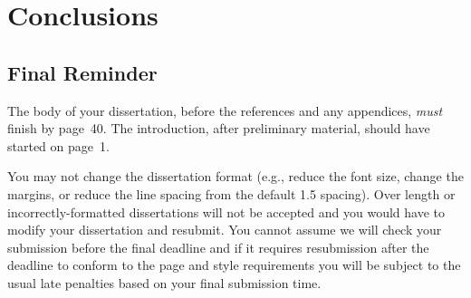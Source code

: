 \documentclass[msc,deptreport.inf]{infthesis} %
\begin{document}
\chapter{Conclusions}\label{ch:conclusions}

\section{Final Reminder}

The body of your dissertation, before the references and any appendices,
\emph{must} finish by page~40. The introduction, after preliminary material,
should have started on page~1.

You may not change the dissertation format (e.g., reduce the font
size, change the margins, or reduce the line spacing from the default
1.5 spacing). Over length or incorrectly-formatted dissertations will
not be accepted and you would have to modify your dissertation and
resubmit.  You cannot assume we will check your submission before the
final deadline and if it requires resubmission after the deadline to
conform to the page and style requirements you will be subject to the
usual late penalties based on your final submission time.
\end{document}
